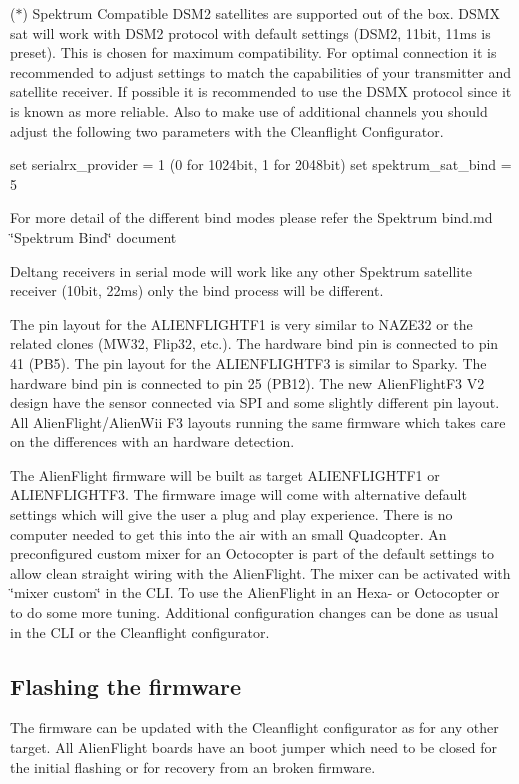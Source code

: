 ($\ast$) Spektrum Compatible D\+S\+M2 satellites are supported out of the box. D\+S\+M\+X sat will work with D\+S\+M2 protocol with default settings (D\+S\+M2, 11bit, 11ms is preset). This is chosen for maximum compatibility. For optimal connection it is recommended to adjust settings to match the capabilities of your transmitter and satellite receiver. If possible it is recommended to use the D\+S\+M\+X protocol since it is known as more reliable. Also to make use of additional channels you should adjust the following two parameters with the Cleanflight Configurator. \begin{DoxyVerb}set serialrx_provider = 1   (0 for 1024bit, 1 for 2048bit) 
set spektrum_sat_bind = 5
\end{DoxyVerb}


For more detail of the different bind modes please refer the Spektrum bind.\+md \char`\"{}\+Spektrum Bind\char`\"{} document

Deltang receivers in serial mode will work like any other Spektrum satellite receiver (10bit, 22ms) only the bind process will be different.

The pin layout for the A\+L\+I\+E\+N\+F\+L\+I\+G\+H\+T\+F1 is very similar to N\+A\+Z\+E32 or the related clones (M\+W32, Flip32, etc.). The hardware bind pin is connected to pin 41 (P\+B5). The pin layout for the A\+L\+I\+E\+N\+F\+L\+I\+G\+H\+T\+F3 is similar to Sparky. The hardware bind pin is connected to pin 25 (P\+B12). The new Alien\+Flight\+F3 V2 design have the sensor connected via S\+P\+I and some slightly different pin layout. All Alien\+Flight/\+Alien\+Wii F3 layouts running the same firmware which takes care on the differences with an hardware detection.

The Alien\+Flight firmware will be built as target A\+L\+I\+E\+N\+F\+L\+I\+G\+H\+T\+F1 or A\+L\+I\+E\+N\+F\+L\+I\+G\+H\+T\+F3. The firmware image will come with alternative default settings which will give the user a plug and play experience. There is no computer needed to get this into the air with an small Quadcopter. An preconfigured custom mixer for an Octocopter is part of the default settings to allow clean straight wiring with the Alien\+Flight. The mixer can be activated with \char`\"{}mixer custom\char`\"{} in the C\+L\+I. To use the Alien\+Flight in an Hexa-\/ or Octocopter or to do some more tuning. Additional configuration changes can be done as usual in the C\+L\+I or the Cleanflight configurator.

\subsection*{Flashing the firmware}

The firmware can be updated with the Cleanflight configurator as for any other target. All Alien\+Flight boards have an boot jumper which need to be closed for the initial flashing or for recovery from an broken firmware. 